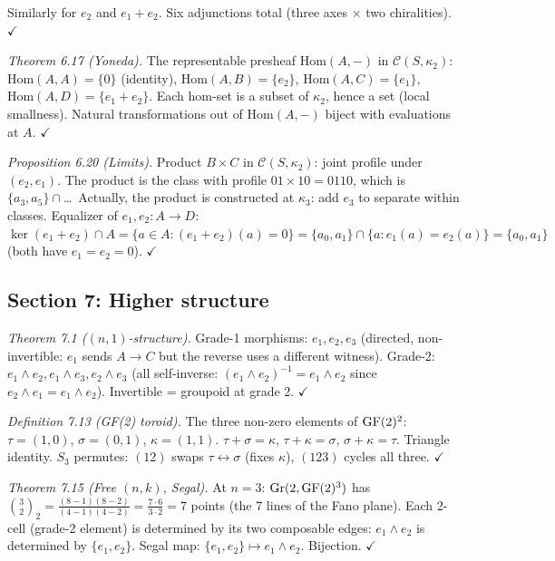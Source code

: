 Similarly for $e_2$ and $e_1{+}e_2$. Six adjunctions
total (three axes $\times$ two chiralities). $\checkmark$

\emph{Theorem 6.17 (Yoneda).}
The representable presheaf $\mathrm{Hom}(A, -)$ in
$\mathcal{C}(S, \kappa_2)$:
$\mathrm{Hom}(A, A) = \{0\}$ (identity),
$\mathrm{Hom}(A, B) = \{e_2\}$,
$\mathrm{Hom}(A, C) = \{e_1\}$,
$\mathrm{Hom}(A, D) = \{e_1{+}e_2\}$.
Each hom-set is a subset of $\kappa_2$, hence a set
(local smallness). Natural transformations out of
$\mathrm{Hom}(A, -)$ biject with evaluations at $A$.
$\checkmark$

\emph{Proposition 6.20 (Limits).}
Product $B \times C$ in $\mathcal{C}(S, \kappa_2)$:
joint profile under $(e_2, e_1)$. The product is
the class with profile $01 \times 10 = 0110$, which
is $\{a_3, a_5\} \cap$\ldots\ Actually, the product
is constructed at $\kappa_3$: add $e_3$ to separate
within classes. Equalizer of $e_1, e_2: A \to D$:
$\ker(e_1 + e_2) \cap A = \{a \in A :
(e_1{+}e_2)(a) = 0\} = \{a_0, a_1\} \cap \{a :
e_1(a) = e_2(a)\} = \{a_0, a_1\}$ (both have
$e_1 = e_2 = 0$). $\checkmark$

\subsection{Section 7: Higher structure}

\emph{Theorem 7.1 ($(n,1)$-structure).}
Grade-1 morphisms: $e_1, e_2, e_3$ (directed,
non-invertible: $e_1$ sends $A \to C$ but the reverse
uses a different witness).
Grade-2: $e_1 \wedge e_2, e_1 \wedge e_3, e_2 \wedge
e_3$ (all self-inverse: $(e_1 \wedge e_2)^{-1} =
e_1 \wedge e_2$ since $e_2 \wedge e_1 = e_1 \wedge
e_2$). Invertible = groupoid at grade 2. $\checkmark$

\emph{Definition 7.13 (GF(2) toroid).}
The three non-zero elements of $\operatorname{GF}(2)^2$:
$\tau = (1,0)$, $\sigma = (0,1)$, $\kappa = (1,1)$.
$\tau + \sigma = \kappa$, $\tau + \kappa = \sigma$,
$\sigma + \kappa = \tau$. Triangle identity.
$S_3$ permutes: $(12)$ swaps $\tau \leftrightarrow
\sigma$ (fixes $\kappa$), $(123)$ cycles all three.
$\checkmark$

\emph{Theorem 7.15 (Free $(n,k)$, Segal).}
At $n = 3$: $\mathrm{Gr}(2, \operatorname{GF}(2)^3)$ has
$\binom{3}{2}_2 = \frac{(8-1)(8-2)}{(4-1)(4-2)} =
\frac{7 \cdot 6}{3 \cdot 2} = 7$ points (the 7 lines
of the Fano plane). Each 2-cell (grade-2 element) is
determined by its two composable edges:
$e_1 \wedge e_2$ is determined by $\{e_1, e_2\}$.
Segal map: $\{e_1, e_2\} \mapsto e_1 \wedge e_2$.
Bijection. $\checkmark$

